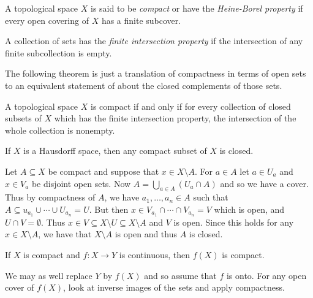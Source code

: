 \documentclass[letterpaper, 11pt, oneside]{book}
\begin{document}
\begin{defn}
  A topological space $X$ is said to be \emph{compact} or have the \emph{Heine-Borel property} if every open covering of $X$ has a finite subcover.
\end{defn}

\begin{defn}
  A collection of sets has the \emph{finite intersection property} if the intersection of any finite subcollection is empty.
\end{defn}

The following theorem is just a translation of compactness in terms of open sets to an equivalent statement of about the closed complements of those sets.

\begin{thrm}\label{thrm: compact_iff_nonempty_intersection}
  A topological space $X$ is compact if and only if for every collection of closed subsets of $X$ which has the finite intersection property, the intersection of the whole collection is nonempty.
\end{thrm}
\begin{pf}
\end{pf}

\begin{thrm}\label{thrm: compact_subset_Hausdorff_closed}
  If $X$ is a Hausdorff space, then any compact subset of $X$ is closed.
\end{thrm}
\begin{pf}
  Let $A \subseteq X$ be compact and suppose that $x \in X \setminus A$.
  For $a \in A$ let $a \in U_{a}$ and $x \in V_{a}$ be disjoint open sets.
  Now $A = \bigcup_{a \in A} (U_{a} \cap A)$ and so we have a cover.
  Thus by compactness of $A$, we have $a_{1}, \ldots, a_{n} \in A$ such that $A \subseteq u_{a_{1}} \cup \cdots \cup U_{a_{n}} = U$.
  But then $x \in V_{a_{1}} \cap \cdots \cap V_{a_{n}} = V$ which is open, and $U \cap V = \emptyset$.
  Thus $x \in V \subseteq X \setminus U \subseteq X \setminus A$ and $V$ is open.
  Since this holds for any $x \in X \setminus A$, we have that $X \setminus A$ is open and thus $A$ is closed.
\end{pf}

\begin{thrm}\label{thrm: image_of_compact_is_compact}
  If $X$ is compact and $f\colon X \to Y$ is continuous, then $f(X)$ is compact.
\end{thrm}
\begin{pf}
  We may as well replace $Y$ by $f(X)$ and so assume that $f$ is onto.
  For any open cover of $f(X)$, look at inverse images of the sets and apply compactness.
\end{pf}
\end{document}
